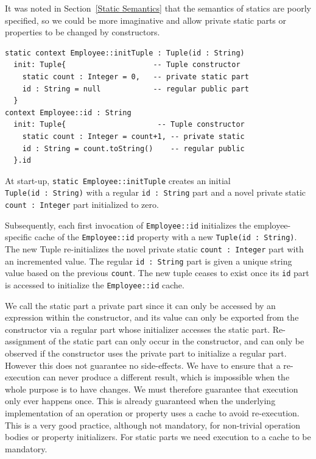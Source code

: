 \documentclass[sigconf]{acmart}
\begin{document}
It was noted in Section~\ref{Static Semantics} that the semantics of statics are poorly specified, so we could be more imaginative and allow private static parts or properties to be changed by constructors.

\begin{verbatim}
static context Employee::initTuple : Tuple(id : String) 
  init: Tuple{                    -- Tuple constructor
    static count : Integer = 0,   -- private static part
    id : String = null            -- regular public part
  }
context Employee::id : String
  init: Tuple{                     -- Tuple constructor
    static count : Integer = count+1, -- private static
    id : String = count.toString()    -- regular public
  }.id
\end{verbatim} 

At start-up, \verb|static Employee::initTuple| creates an initial\\
\verb|Tuple(id : String)| with a regular \verb|id : String| part and a novel private static \verb|count : Integer| part initialized to zero.

Subsequently, each first invocation of \verb|Employee::id| initializes the employee-specific cache of the \verb|Employee::id| property with a new
\verb|Tuple(id : String)|. The new Tuple re-initializes the novel private static \verb|count : Integer| part with an incremented value. The regular \verb|id : String| part is given a unique string value based on the previous \verb|count|. The new tuple ceases to exist once its \verb|id| part is accessed to initialize the \verb|Employee::id| cache.
 
 We call the static part a private part since it can only be accessed by an expression within the constructor, and its value can only be exported from the constructor via a regular part whose initializer accesses the static part. Re-assignment of the static part can only occur in the constructor, and can only be observed if the constructor uses the private part to initialize a regular part. However this does not guarantee no side-effects. We have to ensure that a re-execution can never produce a different result, which is impossible when the whole purpose is to have changes. We must therefore guarantee that execution only ever happens once. This is already guaranteed when the underlying implementation of an operation or property uses a cache to avoid re-execution. This is a very good practice, although not mandatory, for non-trivial operation bodies or property initializers. For static parts we need execution to a cache to be mandatory.
 
\end{document}
